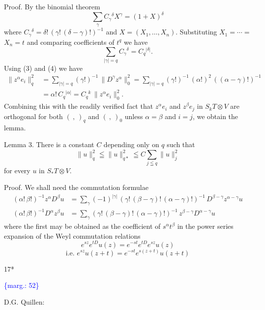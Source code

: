 \documentclass[11pt]{article}
\newcommand{\scanpage}[1]{\par\bigskip\noindent{\small\sffamily[scan #1]}\par}
\newcommand{\mspage}[1]{{\small\sffamily[p.\,#1]}}
\newcommand{\margin}[1]{\textcolor{blue}{\{\textsf{marg.:} #1\}}}
\begin{document}
Proof. By the binomial theorem
\[ \sum_{\gamma} C_{\gamma}{}^{\delta} X^{\gamma} = (1+X)^{\delta} \]
where $C_{\gamma}{}^{\delta} = \delta!\,(\gamma!\,(\delta-\gamma)!)^{-1}$ and $X=(X_1,\dots,X_n)$. Substituting $X_1 = \cdots =$
$X_n = t$ and comparing coefficients of $t^q$ we have
\[ \sum_{|\gamma|=q} C_{\gamma}{}^{\delta} = C_q{}^{|\delta|}. \tag{4} \]
Using (3) and (4) we have
\[ \begin{aligned} \|z^{\alpha} e_i\|_q^2 &= \sum_{|\gamma|=q} (\gamma!)^{-1}\, \|D^{\gamma} z^{\alpha}\|_0^2 = \sum_{|\gamma|=q} (\gamma!)^{-1}\, (\alpha!)^2\, ((\alpha-\gamma)!)^{-1} \\ &= \alpha!\, C_q{}^{|\alpha|} = C_q{}^k\, \|z^{\alpha} e_i\|_0^2 . \end{aligned} \]
Combining this with the readily verified fact that $z^{\alpha} e_i$ and $z^{\beta} e_j$ in $S_k T \otimes V$
are orthogonal for both $(\ ,\ )_q$ and $(\ ,\ )_0$ unless $\alpha=\beta$ and $i=j$, we obtain
the lemma.

Lemma 3. There is a constant $C$ depending only on $q$ such that
\[ \|u\|_q^2 \leqq \|u\|_{q*}^2 \leqq C \sum_{j \leqq q} \|u\|_j^2 \]
for every $u$ in $S_* T \otimes V$.

Proof. We shall need the commutation formulae
\[ \begin{aligned} (\alpha!\,\beta!)^{-1} z^{\alpha} D^{\beta} u &= \sum_{\gamma} (-1)^{|\gamma|}\, (\gamma!\,(\beta-\gamma)!\,(\alpha-\gamma)!)^{-1}\, D^{\beta-\gamma} z^{\alpha-\gamma} u \\ (\alpha!\,\beta!)^{-1} D^{\alpha} z^{\beta} u &= \sum_{\gamma} (\gamma!\,(\beta-\gamma)!\,(\alpha-\gamma)!)^{-1}\, z^{\beta-\gamma} D^{\alpha-\gamma} u \end{aligned} \tag{5} \]
where the first may be obtained as the coefficient of $s^{\alpha} t^{\beta}$ in the power
series expansion of the Weyl commutation relations
\[ e^{sz} e^{tD} u(z) = e^{-st} e^{tD} e^{sz} u(z) \]
\[ \text{i.e. } e^{sz} u(z+t) = e^{-st} e^{s(z+t)} u(z+t) \]

17*

\margin{52}

\clearpage
\scanpage{162-5/53}
\mspage{240} D.G. Quillen:
\end{document}
